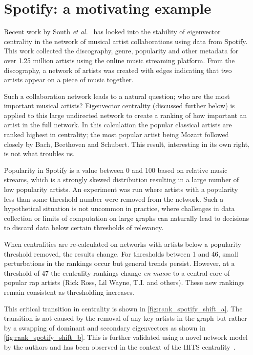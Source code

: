 \section{Spotify: a motivating example}

Recent work by South \emph{et al.}~\cite{south_centrality_2021} has looked into the stability of eigenvector centrality in the network of musical artist collaborations using data from Spotify. This work collected the discography, genre, popularity and other metadata for over 1.25 million artists using the online music streaming platform. From the discography, a network of artists was created with edges indicating that two artists appear on a piece of music together. 

Such a collaboration network leads to a natural question; who are the most important musical artists? Eigenvector centrality (discussed further below) is applied to this large undirected network to create a ranking of how important an artist in the full network. In this calculation the popular classical artists are ranked highest in centrality; the most popular artist being Mozart followed closely by Bach, Beethoven and Schubert. This result, interesting in its own right, is not what troubles us.

Popularity in Spotify is a value between 0 and 100 based on relative music streams, which is a strongly skewed distribution resulting in a large number of low popularity artists. An experiment was run where artists with a popularity less than some threshold number were removed from the network.  Such a hypothetical situation is not uncommon in practice, where challenges in data collection or limits of computation on large graphs can naturally lead to decisions to discard data below certain thresholds of relevancy.

When centralities are re-calculated on networks with artists below a popularity threshold removed, the results change. For thresholds between 1 and 46, small perturbations in the rankings occur but general trends persist. However, at a threshold of 47 the centrality rankings change {\em en masse} to a central core of popular rap artists (Rick Ross, Lil Wayne, T.I. and others). These new rankings remain consistent as thresholding increases.

This critical transition in centrality is shown in \autoref{fig:rank_spotify_shift_a}. The transition is not caused by the removal of any key artists in the graph but rather by a swapping of dominant and secondary eigenvectors as shown in \autoref{fig:rank_spotify_shift_b}. This is further validated using a novel network model by the authors and has been observed in the context of the HITS centrality~\cite{ng_link_2001}.


